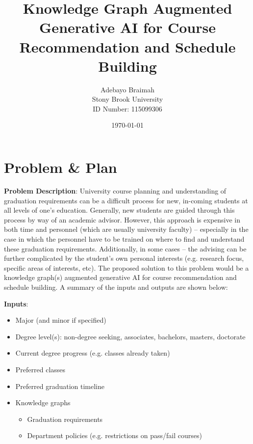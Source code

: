 \documentclass[12pt]{article}
\title{\Large \bf 
Knowledge Graph Augmented Generative AI for Course Recommendation and Schedule Building
}
\author{
{\rm Adebayo Braimah}\\
Stony Brook University \\
{\rm ID Number: 115099306}
}
\date{\today}
\begin{document}
    
    \maketitle
    
    \section{Problem \& Plan}
    \label{sec:prob_plan}


    \textbf{Problem Description}: University course planning and understanding of graduation requirements can be a difficult process for new, in-coming students at all levels of one's education. Generally, new students are guided through this process by way of an academic advisor. However, this approach is expensive in both time and personnel (which are usually university faculty) -- especially in the case in which the personnel have to be trained on where to find and understand these graduation requirements. Additionally, in some cases -- the advising can be further complicated by the student's own personal interests (e.g. research focus, specific areas of interests, etc). The proposed solution to this problem would be a knowledge graph(s) augmented generative AI for course recommendation and schedule building. A summary of the inputs and outputs are shown below:

    \textbf{Inputs}:

    \begin{itemize}
        \label{items:inputs}
        \item Major (and minor if specified)
        \item Degree level(s): non-degree seeking, associates, bachelors, masters, doctorate
        \item Current degree progress (e.g. classes already taken)
        \item Preferred classes
        \item Preferred graduation timeline
        \item Knowledge graphs
        \begin{itemize}
            \item Graduation requirements
            \item Department policies (e.g. restrictions on pass/fail courses)
        \end{itemize}
    \end{itemize}
\end{document}
